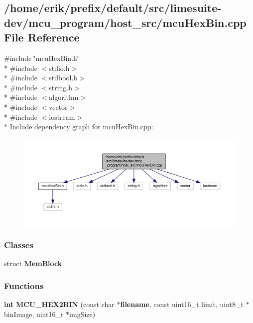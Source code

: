 \subsection{/home/erik/prefix/default/src/limesuite-\/dev/mcu\+\_\+program/host\+\_\+src/mcu\+Hex\+Bin.cpp File Reference}
\label{mcuHexBin_8cpp}
{\ttfamily \#include \char`\"{}mcu\+Hex\+Bin.\+h\char`\"{}}\\*
{\ttfamily \#include $<$stdio.\+h$>$}\\*
{\ttfamily \#include $<$stdbool.\+h$>$}\\*
{\ttfamily \#include $<$string.\+h$>$}\\*
{\ttfamily \#include $<$algorithm$>$}\\*
{\ttfamily \#include $<$vector$>$}\\*
{\ttfamily \#include $<$iostream$>$}\\*
Include dependency graph for mcu\+Hex\+Bin.\+cpp\+:
\nopagebreak
\begin{figure}[H]
\begin{center}
\leavevmode
\includegraphics[width=350pt]{d5/de2/mcuHexBin_8cpp__incl}
\end{center}
\end{figure}
\subsubsection*{Classes}
\begin{DoxyCompactItemize}
\item 
struct {\bf Mem\+Block}
\end{DoxyCompactItemize}
\subsubsection*{Functions}
\begin{DoxyCompactItemize}
\item 
{\bf int} {\bf M\+C\+U\+\_\+\+H\+E\+X2\+B\+IN} (const char $\ast${\bf filename}, const uint16\+\_\+t limit, uint8\+\_\+t $\ast$bin\+Image, uint16\+\_\+t $\ast$img\+Size)
\end{DoxyCompactItemize}


